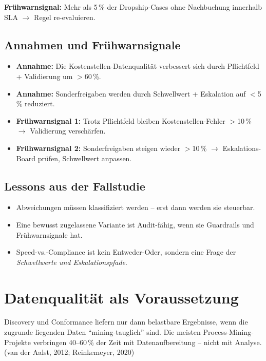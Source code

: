 \documentclass[11pt,a4paper,oneside]{article}
\newcommand{\quelle}[1]{{\footnotesize\color{lpGray}(#1)}}
\begin{document}
\textbf{Frühwarnsignal:} Mehr als 5\,\% der Dropship-Cases ohne Nachbuchung innerhalb SLA $\rightarrow$ Regel re-evaluieren.

\subsection{Annahmen und Frühwarnsignale}

\begin{itemize}
  \item \textbf{Annahme:} Die Kostenstellen-Datenqualität verbessert sich durch Pflichtfeld + Validierung um $>$60\,\%.
  \item \textbf{Annahme:} Sonderfreigaben werden durch Schwellwert + Eskalation auf $<$5\,\% reduziert.
  \item \textbf{Frühwarnsignal 1:} Trotz Pflichtfeld bleiben Kostenstellen-Fehler $>$10\,\% $\rightarrow$ Validierung verschärfen.
  \item \textbf{Frühwarnsignal 2:} Sonderfreigaben steigen wieder $>$10\,\% $\rightarrow$ Eskalations-Board prüfen, Schwellwert anpassen.
\end{itemize}

\subsection{Lessons aus der Fallstudie}

\begin{itemize}
  \item Abweichungen müssen klassifiziert werden -- erst dann werden sie steuerbar.
  \item Eine bewusst zugelassene Variante ist Audit-fähig, wenn sie Guardrails und Frühwarnsignale hat.
  \item Speed-vs.-Compliance ist kein Entweder-Oder, sondern eine Frage der \emph{Schwellwerte und Eskalationspfade}.
\end{itemize}

\section{Datenqualität als Voraussetzung}

Discovery und Conformance liefern nur dann belastbare Ergebnisse, wenn die zugrunde liegenden Daten ``mining-tauglich'' sind. Die meisten Process-Mining-Projekte verbringen 40--60\,\% der Zeit mit Datenaufbereitung -- nicht mit Analyse. \quelle{van der Aalst, 2012; Reinkemeyer, 2020}
\end{document}
